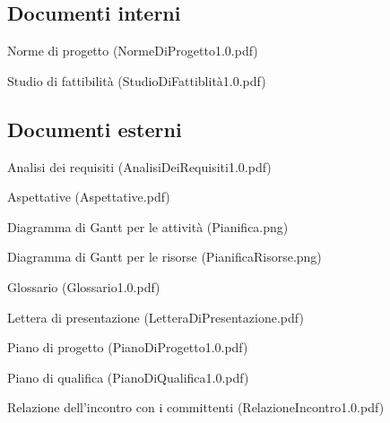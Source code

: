 \subsection{Documenti interni}
\begin{list}{-}{}
\item Norme di progetto (NormeDiProgetto1.0.pdf)
\item Studio di fattibilit\`a (StudioDiFattiblit\`a1.0.pdf)
\end{list}
\subsection{Documenti esterni}
\begin{list}{-}{}
\item Analisi dei requisiti (AnalisiDeiRequisiti1.0.pdf)
\item Aspettative (Aspettative.pdf)
\item Diagramma di Gantt per le attivit\`a (Pianifica.png)
\item Diagramma di Gantt per le risorse (PianificaRisorse.png)
\item Glossario (Glossario1.0.pdf)
\item Lettera di presentazione (LetteraDiPresentazione.pdf)
\item Piano di progetto (PianoDiProgetto1.0.pdf)
\item Piano di qualifica (PianoDiQualifica1.0.pdf)
\item Relazione dell'incontro con i committenti (RelazioneIncontro1.0.pdf)
\end{list}


